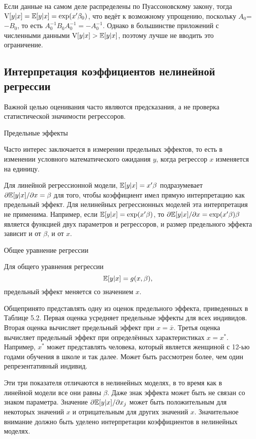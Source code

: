 Если данные на самом деле распределены по Пуассоновскому закону, тогда $\mathrm{V}[y|x]=\mathbb{E}[y|x]= \exp(x'\beta_0)$, что ведёт к возможному упрощению, поскольку $A_0$=$-B_0$, то есть $A_0^{-1}B_0 A_0^{-1}=-A_0^{-1}$. Однако в большинстве приложений с численными данными $\mathrm{V}[y|x]>\mathbb{E}[y|x]$, поэтому лучше не вводить это ограничение.

\subsection{Интерпретация коэффициентов нелинейной регрессии}

Важной целью оценивания часто являются предсказания, а не проверка статистической значимости регрессоров.

\begin{center}
Предельные эффекты
\end{center}

Часто интерес заключается в измерении предельных эффектов, то есть в изменении условного математического ожидания $y$, когда регрессор $x$ изменяется на единицу.

Для линейной регрессионной модели, $\mathbb{E}[y|x]= x'\beta$ подразумевает $\partial \mathbb{E}[y|x] / \partial x = \beta$ для того, чтобы коэффициент имел прямую интерпретацию как предельный эффект. Для нелинейных регрессионных моделей эта интерпретация не применима. Например, если $\mathbb{E}[y|x]= \exp(x'\beta)$, то $\partial \mathbb{E}[y|x] / \partial x = \exp(x'\beta)\beta$ является функцией двух параметров и регрессоров, и размер предельного эффекта зависит и от $\beta$, и от $x$.

\begin{center}
Общее уравнение регрессии
\end{center}

Для общего уравнения регрессии
\[
\mathbb{E}[y|x]= g(x, \beta),
\]
предельный эффект меняется со значением $x$.

Общепринято представлять одну из оценок предельного эффекта, приведенных в Таблице 5.2. Первая оценка усредняет предельные эффекты для всех индивидов. Вторая оценка вычисляет предельный эффект при $x=\bar{x}$. Третья оценка вычисляет предельный эффект при определённых характеристиках $x=x^*$. Например, $x^*$ может представлять человека, который является женщиной с 12-ью годами обучения в школе и так далее. Может быть рассмотрен более, чем один репрезентативный индивид.

Эти три показателя отличаются в нелинейных моделях, в то время как в линейной модели все они равны $\beta$. Даже знак эффекта может быть не связан со знаком параметра. Значение $\partial \mathbb{E}[y|x] / \partial x_j$ может быть положительным для некоторых значений $x$ и отрицательным для других значений $x$. Значительное внимание должно быть уделено интерпретации коэффициентов в нелинейных моделях.

